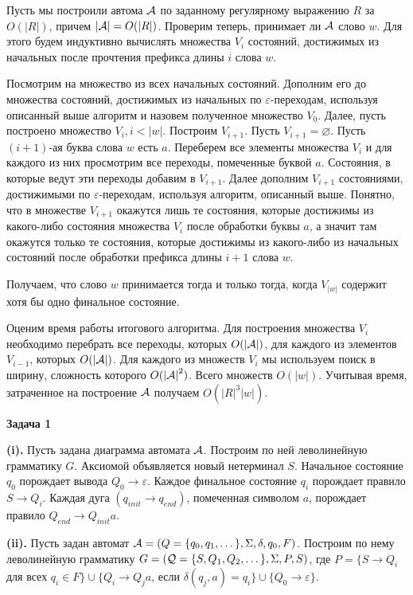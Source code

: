 \documentclass[10pt]{article}
\let \eps \varepsilon
\begin{document}
\smallskip

Пусть мы построили автома ${\cal A}$ по заданному регулярному выражению $R$ за $O(|R|)$, причем $|{\cal A}| = O(|R|)$. Проверим теперь, принимает ли ${\cal A}$ слово $w$. Для этого будем индуктивно вычислять множества $V_i$ состояний, достижимых из начальных после прочтения префикса длины $i$ слова $w$.

Посмотрим на множество из всех начальных состояний. Дополним его до множества состояний, достижимых из начальных по $\eps$-переходам, используя описанный выше алгоритм и назовем полученное множество $V_0$. Далее, пусть построено множество $V_i, i < |w|$. Построим $V_{i + 1}$. Пусть $V_{i + 1} = \varnothing$. Пусть $(i + 1)$-ая буква слова $w$ есть $a$. Переберем все элементы множества $V_i$ и для каждого из них просмотрим все переходы, помеченные буквой $a$. Состояния, в которые ведут эти переходы добавим в $V_{i + 1}$. Далее дополним $V_{i + 1}$ состояниями, достижимыми по $\eps$-переходам, используя алгоритм, описанный выше. Понятно, что в множестве $V_{i + 1}$ окажутся лишь те состояния, которые достижимы из какого-либо состояния множества $V_i$ после обработки буквы $a$, а значит там окажутся только те состояния, которые достижимы из какого-либо из начальных состояний после обработки префикса длины $i + 1$ слова $w$.

Получаем, что слово $w$ принимается тогда и только тогда, когда $V_{|w|}$ содержит хотя бы одно финальное состояние.

Оценим время работы итогового алгоритма. Для построения множества $V_i$ необходимо перебрать все переходы, которых $O(|{\cal A}|)$, для каждого из элементов $V_{i - 1}$, которых $O(|{\cal A}|)$. Для каждого из множеств $V_i$ мы используем поиск в ширину, сложность которого $O({|{\cal A}|}^2)$. Всего множеств $O(|w|)$. Учитывая время, затраченное на построение ${\cal A}$ получаем $O(|R|^3 |w|)$.

\medskip

{\bf Задача 1}

{\bf (i).}
Пусть задана диаграмма автомата ${\cal A}$. Построим по ней леволинейную грамматику $G$. Аксиомой объявляется новый нетерминал $S$. Начальное состояние $q_0$ порождает вывода $Q_0 \rightarrow \eps$. Каждое финальное состояние $q_i$ порождает правило $S \rightarrow Q_i$. Каждая дуга $(q_{init} \rightarrow q_{end})$, помеченная символом $a$, порождает правило $Q_{end} \rightarrow Q_{init} a$.

\smallskip

{\bf (ii).}
Пусть задан автомат ${\cal A} = (Q = \{ q_0, q_1, \dots \}, \Sigma, \delta, q_0, F)$. Построим по нему леволинейную грамматику $G = ({\cal Q} = \{ S, Q_1, Q_2, \dots \}, \Sigma, P, S)$, где $P = \{ S \rightarrow Q_i$ для всех $q_i \in F \} \cup \{ Q_i \rightarrow Q_j a$, если $\delta (q_j, a) = q_i \} \cup \{ Q_0 \rightarrow \eps \}$.
\end{document}
